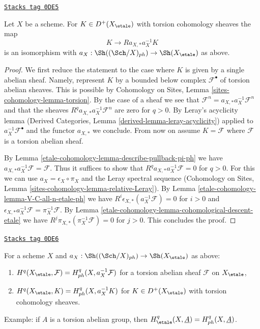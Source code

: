 \begin{lemma}
\label{etale-cohomology-lemma-cohomological-descent-etale-ph}
\href{https://stacks.math.columbia.edu/tag/0DE5}{\texttt{Stacks tag 0DE5}}

Let $X$ be a scheme. For $K \in D^+(X_\etale)$ with torsion cohomology
sheaves the map
$$
K \longrightarrow Ra_{X, *}a_X^{-1}K
$$
is an isomorphism with $a_X : \Sh((\Sch/X)_{ph}) \to \Sh(X_\etale)$ as above.
\end{lemma}

\begin{proof}
We first reduce the statement to the case where
$K$ is given by a single abelian sheaf. Namely, represent $K$
by a bounded below complex $\mathcal{F}^\bullet$ of torsion
abelian sheaves. This is possible by Cohomology on Sites, Lemma
\ref{sites-cohomology-lemma-torsion}. By the case of a
sheaf we see that
$\mathcal{F}^n = a_{X, *} a_X^{-1} \mathcal{F}^n$
and that the sheaves $R^qa_{X, *}a_X^{-1}\mathcal{F}^n$
are zero for $q > 0$. By Leray's acyclicity lemma
(Derived Categories, Lemma \ref{derived-lemma-leray-acyclicity})
applied to $a_X^{-1}\mathcal{F}^\bullet$
and the functor $a_{X, *}$ we conclude. From now on assume $K = \mathcal{F}$
where $\mathcal{F}$ is a torsion abelian sheaf.

\medskip\noindent
By Lemma \ref{etale-cohomology-lemma-describe-pullback-pi-ph} we have
$a_{X, *}a_X^{-1}\mathcal{F} = \mathcal{F}$. Thus it suffices to show that
$R^qa_{X, *}a_X^{-1}\mathcal{F} = 0$ for $q > 0$.
For this we can use $a_X = \epsilon_X \circ \pi_X$ and
the Leray spectral sequence
(Cohomology on Sites, Lemma \ref{sites-cohomology-lemma-relative-Leray}).
By Lemma \ref{etale-cohomology-lemma-V-C-all-n-etale-ph}
we have $R^i\epsilon_{X, *}(a_X^{-1}\mathcal{F}) = 0$ for $i > 0$
and $\epsilon_{X, *}a_X^{-1}\mathcal{F} = \pi_X^{-1}\mathcal{F}$.
By Lemma \ref{etale-cohomology-lemma-cohomological-descent-etale} we have
$R^j\pi_{X, *}(\pi_X^{-1}\mathcal{F}) = 0$ for $j > 0$.
This concludes the proof.
\end{proof}

\begin{lemma}
\label{etale-cohomology-lemma-compare-cohomology-etale-ph}
\href{https://stacks.math.columbia.edu/tag/0DE6}{\texttt{Stacks tag 0DE6}}

For a scheme $X$ and $a_X : \Sh((\Sch/X)_{ph}) \to \Sh(X_\etale)$
as above:
\begin{enumerate}
\item $H^q(X_\etale, \mathcal{F}) = H^q_{ph}(X, a_X^{-1}\mathcal{F})$
for a torsion abelian sheaf $\mathcal{F}$ on $X_\etale$,
\item $H^q(X_\etale, K) = H^q_{ph}(X, a_X^{-1}K)$
for $K \in D^+(X_\etale)$ with torsion cohomology sheaves.
\end{enumerate}
Example: if $A$ is a torsion abelian group, then
$H^q_\etale(X, \underline{A}) = H^q_{ph}(X, \underline{A})$.
\end{lemma}

